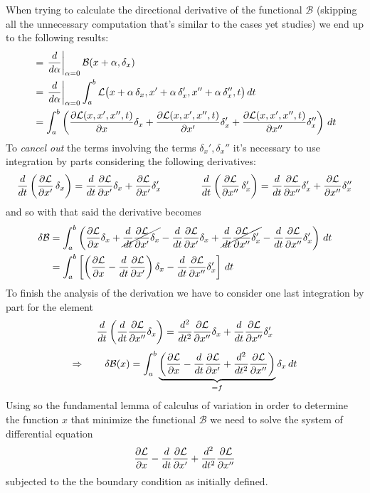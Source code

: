 	When trying to calculate the directional derivative of the functional $\mathcal B$ (skipping all the unnecessary computation that's similar to the cases yet studies) we end up to the following results:
	\begin{align*}
		& = \left.\frac{d}{d\alpha}\right|_{\alpha = 0} \mathcal B(x+\alpha, \delta_x) \\
		& = \left. \frac{d}{d\alpha}\right|_{\alpha = 0} \int_a^b \mathcal L\big( x + \alpha\, \delta_x, x' + \alpha\, \delta_x', x''+\alpha\, \delta_x'',t\big) \, dt \\
		& = \int_a^b \left( \frac{\partial \mathcal L(x,x',x'',t)}{\partial x}\delta_x + \frac{\partial \mathcal L(x,x',x'',t)}{\partial x'}\delta_x' + \frac{\partial \mathcal L(x,x',x'',t)}{\partial x''}\delta_x'' \right) \, dt
	\end{align*}
	To \textit{cancel out} the terms involving the terms $\delta_x',\delta_x''$ it's necessary to use integration by parts considering the following derivatives:
	\[ \frac d{dt} \left(\frac{\partial \mathcal L}{\partial x'}\, \delta_x \right) = \frac d{dt} \frac{\partial \mathcal L}{\partial x'} \delta_x + \frac{\partial \mathcal L}{\partial x'} \delta_x' \qquad \qquad \frac d{dt} \left(\frac{\partial \mathcal L}{\partial x''}\, \delta_x' \right) = \frac d{dt} \frac{\partial \mathcal L}{\partial x''} \delta_x' + \frac{\partial \mathcal L}{\partial x''}\delta_x''  \]
	and so with that said the derivative becomes
	\begin{align*}
		\delta \mathcal B& = \int_a^b \left( \frac{\partial \mathcal L}{\partial x}\delta_x + \cancel{\frac d{dt} \frac{\partial \mathcal L}{\partial x'} \delta_x } -  \frac{d}{dt} \frac{\partial \mathcal L}{\partial x'} \delta_x + \cancel{\frac d{dt} \frac{\partial \mathcal L}{\partial x''} \delta_x' } - \frac{d}{dt} \frac{\partial \mathcal L}{\partial x''} \delta_x' \right)\, dt \\
		& = \int_a^b \left[\left( \frac{\partial \mathcal L}{\partial x}  -  \frac{d}{dt} \frac{\partial \mathcal L}{\partial x'} \right)\delta_x - \frac{d}{dt} \frac{\partial \mathcal L}{\partial x''} \delta_x' \right]\, dt
	\end{align*}
	To finish the analysis of the derivation we have to consider one last integration by part for the element
	\[ \frac{d}{dt} \left( \frac{d}{dt} \frac{\partial \mathcal L}{\partial x''} \delta_x \right) = \frac{d^2}{dt^2} \frac{\partial \mathcal L}{\partial x''} \delta_x + \frac{d}{dt} \frac{\partial \mathcal L}{\partial x''} \delta_x' \]
	\begin{equation}
		\Rightarrow \qquad \delta\mathcal B(x) = \int_a^b \underbrace{\left( \frac{\partial \mathcal L}{\partial x} - \frac d {dt} \frac{\partial \mathcal L}{\partial x'} + \frac{d^2}{dt^2} \frac{\partial \mathcal L}{\partial x''} \right)}_{=f} \delta_x\, dt
	\end{equation}
	Using so the fundamental lemma of calculus of variation in order to determine the function $x$ that minimize the functional $\mathcal B$ we need to solve the system of differential equation
	\[   \frac{\partial \mathcal L}{\partial x} - \frac d {dt} \frac{\partial \mathcal L}{\partial x'} + \frac{d^2}{dt^2} \frac{\partial \mathcal L}{\partial x''} \]
	subjected to the the boundary condition as initially defined.	
	
	
	
	
	
	
	
	
	
	
	
	
	
	
	
	
	
	
	
	
	
	
	
	
	
	